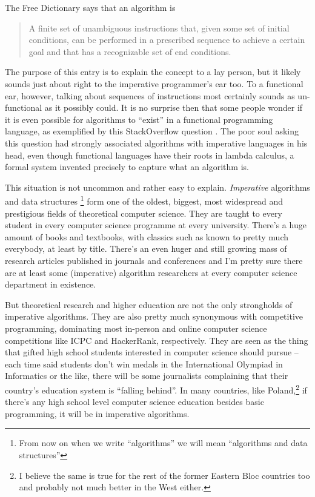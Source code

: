 \documentclass[declaration,mgr,english,shortabstract]{iithesis}
\begin{document}
The Free Dictionary says \cite{TheFreeDictionary} that an algorithm is

\begin{quote}
    A finite set of unambiguous instructions that, given some set of initial conditions, can be performed in a prescribed sequence to achieve a certain goal and that has a recognizable set of end conditions.
\end{quote}

The purpose of this entry is to explain the concept to a lay person, but it likely sounds just about right to the imperative programmer's ear too. To a functional ear, however, talking about sequences of instructions most certainly sounds as un-functional as it possibly could. It is no surprise then that some people wonder if it is even possible for algorithms to ``exist'' in a functional programming language, as exemplified by this StackOverflow question \cite{SO}. The poor soul asking this question had strongly associated algorithms with imperative languages in his head, even though functional languages have their roots in lambda calculus, a formal system invented precisely to capture what an algorithm is.

This situation is not uncommon and rather easy to explain. \textit{Imperative} algorithms and data structures \footnote{From now on when we write ``algorithms'' we will mean ``algorithms and data structures''} form one of the oldest, biggest, most widespread and prestigious fields of theoretical computer science. They are taught to every student in every computer science programme at every university. There's a huge amount of books and textbooks, with classics such as \cite{CLRS} \cite{TAOCP} known to pretty much everybody, at least by title. There's an even huger and still growing mass of research articles published in journals and conferences and I'm pretty sure there are at least some (imperative) algorithm researchers at every computer science department in existence.

But theoretical research and higher education are not the only strongholds of imperative algorithms. They are also pretty much synonymous with competitive programming, dominating most in-person and online computer science competitions like ICPC and HackerRank, respectively. They are seen as the thing that gifted high school students interested in computer science should pursue -- each time said students don't win medals in the International Olympiad in Informatics or the like, there will be some journalists complaining that their country's education system is ``falling behind''. In many countries, like Poland,\footnote{I believe the same is true for the rest of the former Eastern Bloc countries too and probably not much better in the West either.} if there's any high school level computer science education besides basic programming, it will be in imperative algorithms.
\end{document}
